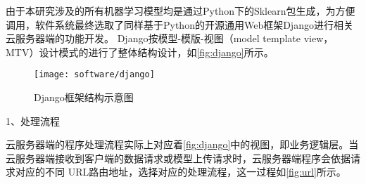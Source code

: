由于本研究涉及的所有机器学习模型均是通过Python下的Sklearn包生成，为方便调用，软件系统最终选取了同样基于Python的开源通用Web框架Django进行相关云服务器端的功能开发\cite{django}。
Django按模型-模版-视图（model template view，MTV）设计模式的进行了整体结构设计\cite{django}，如\autoref{fig:django}所示。
\begin{figure}[htbp]
    \centering
    \texttt{[image: software/django]}
    \caption[Django框架结构示意图]{\label{fig:django}Django框架结构示意图}
\end{figure}

1、处理流程

云服务器端的程序处理流程实际上对应着\autoref{fig:django}中的视图，即业务逻辑层。当云服务器端接收到客户端的数据请求或模型上传请求时，云服务器端程序会依据请求对应的不同
URL路由地址，选择对应的处理流程，这一过程如\autoref{fig:url}所示。

